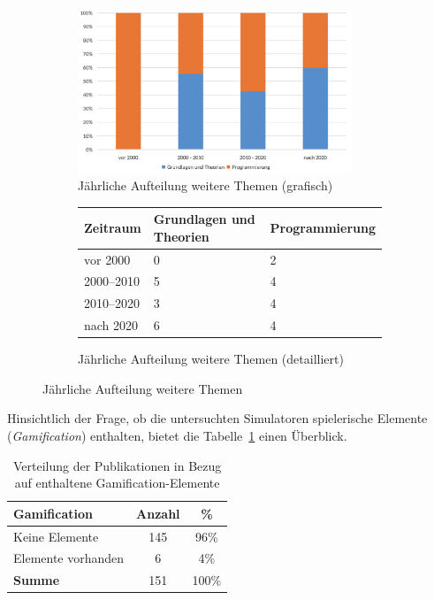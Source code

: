 \begin{figure}[!htbp]
    \centering
    \begin{subfigure}[b]{0.48\textwidth}
        \centering
        \includegraphics[width=0.90\textwidth]{graphics_lit/5-top5-themen-jahr.png}
        \caption{Jährliche Aufteilung weitere Themen (grafisch)}
        \label{fig:5-top5-themen}
    \end{subfigure}
    \hfill
    \begin{subfigure}[b]{0.48\textwidth}
        \centering
        \tiny
        \begin{tabularx}{\textwidth}{lXX}
            \hline
            \textbf{Zeitraum} & \textbf{Grundlagen und Theorien} & \textbf{Programmierung} \\
            \hline
            vor 2000      & 0 & 2 \\
            2000--2010    & 5 & 4 \\
            2010--2020    & 3 & 4 \\
            nach 2020     & 6 & 4 \\
            \hline
        \end{tabularx}
        \caption{Jährliche Aufteilung weitere Themen (detailliert)}
        \label{tab:themen-zeit-2}
    \end{subfigure}
    \caption{Jährliche Aufteilung weitere Themen}
    \label{fig:pub-typen}
\end{figure}

Hinsichtlich der Frage, ob die untersuchten Simulatoren spielerische Elemente (\textit{Gamification}) enthalten, bietet die Tabelle~\ref{tab:gamification} einen Überblick.

\begin{table}[!htbp]
    \centering
    \tiny
    \begin{tabular}{l c c}
        \hline
        \textbf{Gamification} & \textbf{Anzahl} & \textbf{\%} \\
        \hline
        Keine Elemente     & 145 & 96\% \\
        Elemente vorhanden & 6   & 4\%  \\
        \hline
        \textbf{Summe}     & 151 & 100\% \\
        \hline
    \end{tabular}
    \caption{Verteilung der Publikationen in Bezug auf enthaltene Gamification-Elemente}
    \label{tab:gamification}
\end{table}

